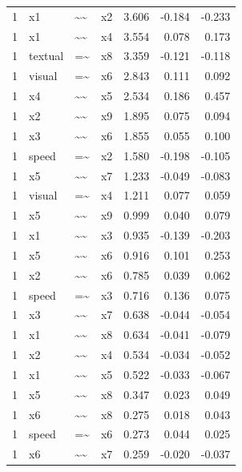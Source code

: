 \documentclass[11pt]{article}
\begin{document}
\begin{longtable}{llllrrr}
1 & x1 & \textasciitilde{}\textasciitilde{} & x2 & 3.606 & -0.184 & -0.233 \\
1 & x1 & \textasciitilde{}\textasciitilde{} & x4 & 3.554 & 0.078 & 0.173 \\
1 & textual & =\textasciitilde{} & x8 & 3.359 & -0.121 & -0.118 \\
1 & visual & =\textasciitilde{} & x6 & 2.843 & 0.111 & 0.092 \\
1 & x4 & \textasciitilde{}\textasciitilde{} & x5 & 2.534 & 0.186 & 0.457 \\
1 & x2 & \textasciitilde{}\textasciitilde{} & x9 & 1.895 & 0.075 & 0.094 \\
1 & x3 & \textasciitilde{}\textasciitilde{} & x6 & 1.855 & 0.055 & 0.100 \\
1 & speed & =\textasciitilde{} & x2 & 1.580 & -0.198 & -0.105 \\
1 & x5 & \textasciitilde{}\textasciitilde{} & x7 & 1.233 & -0.049 & -0.083 \\
1 & visual & =\textasciitilde{} & x4 & 1.211 & 0.077 & 0.059 \\
1 & x5 & \textasciitilde{}\textasciitilde{} & x9 & 0.999 & 0.040 & 0.079 \\
1 & x1 & \textasciitilde{}\textasciitilde{} & x3 & 0.935 & -0.139 & -0.203 \\
1 & x5 & \textasciitilde{}\textasciitilde{} & x6 & 0.916 & 0.101 & 0.253 \\
1 & x2 & \textasciitilde{}\textasciitilde{} & x6 & 0.785 & 0.039 & 0.062 \\
1 & speed & =\textasciitilde{} & x3 & 0.716 & 0.136 & 0.075 \\
1 & x3 & \textasciitilde{}\textasciitilde{} & x7 & 0.638 & -0.044 & -0.054 \\
1 & x1 & \textasciitilde{}\textasciitilde{} & x8 & 0.634 & -0.041 & -0.079 \\
1 & x2 & \textasciitilde{}\textasciitilde{} & x4 & 0.534 & -0.034 & -0.052 \\
1 & x1 & \textasciitilde{}\textasciitilde{} & x5 & 0.522 & -0.033 & -0.067 \\
1 & x5 & \textasciitilde{}\textasciitilde{} & x8 & 0.347 & 0.023 & 0.049 \\
1 & x6 & \textasciitilde{}\textasciitilde{} & x8 & 0.275 & 0.018 & 0.043 \\
1 & speed & =\textasciitilde{} & x6 & 0.273 & 0.044 & 0.025 \\
1 & x6 & \textasciitilde{}\textasciitilde{} & x7 & 0.259 & -0.020 & -0.037 \\

\end{longtable}
\end{document}
